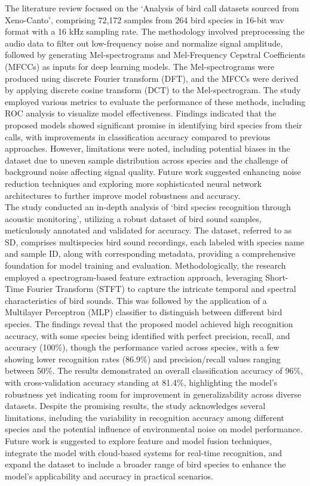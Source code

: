 The literature review focused on the `Analysis of bird call datasets sourced
from Xeno-Canto', comprising 72,172 samples from 264 bird species in 16-bit wav
format with a 16 kHz sampling rate. The methodology involved preprocessing the
audio data to filter out low-frequency noise and normalize signal amplitude,
followed by generating Mel-spectrograms and Mel-Frequency Cepstral Coefficients
(MFCCs) as inputs for deep learning models. The Mel-spectrograms were produced
using discrete Fourier transform (DFT), and the MFCCs were derived by applying
discrete cosine transform (DCT) to the Mel-spectrogram. The study employed
various metrics to evaluate the performance of these methods, including ROC
analysis to visualize model effectiveness. Findings indicated that the proposed
models showed significant promise in identifying bird species from their calls,
with improvements in classification accuracy compared to previous approaches.
However, limitations were noted, including potential biases in the dataset due
to uneven sample distribution across species and the challenge of background
noise affecting signal quality. Future work suggested enhancing noise reduction
techniques and exploring more sophisticated neural network architectures to
further improve model robustness and accuracy.\cite{wang2022efficient}\\

The study conducted an in-depth analysis of `bird species recognition through
acoustic monitoring', utilizing a robust dataset of bird sound samples,
meticulously annotated and validated for accuracy. The dataset, referred to as
SD, comprises multispecies bird sound recordings, each labeled with species
name and sample ID, along with corresponding metadata, providing a
comprehensive foundation for model training and evaluation. Methodologically,
the research employed a spectrogram-based feature extraction approach,
leveraging Short-Time Fourier Transform (STFT) to capture the intricate
temporal and spectral characteristics of bird sounds. This was followed by the
application of a Multilayer Perceptron (MLP) classifier to distinguish between
different bird species. The findings reveal that the proposed model achieved
high recognition accuracy, with some species being identified with perfect
precision, recall, and accuracy (100\%), though the performance varied across
species, with a few showing lower recognition rates (86.9\%) and
precision/recall values ranging between 50\%. The results demonstrated an
overall classification accuracy of 96\%, with cross-validation accuracy
standing at 81.4\%, highlighting the model's robustness yet indicating room for
improvement in generalizability across diverse datasets. Despite the promising
results, the study acknowledges several limitations, including the variability
in recognition accuracy among different species and the potential influence of
environmental noise on model performance. Future work is suggested to explore
feature and model fusion techniques, integrate the model with cloud-based
systems for real-time recognition, and expand the dataset to include a broader
range of bird species to enhance the model's applicability and accuracy in
practical scenarios.\cite{pahuja2021sound}\\ 

